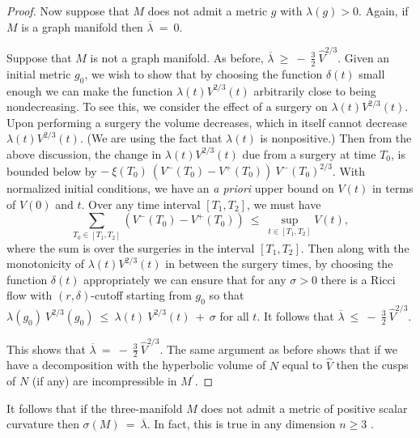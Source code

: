 \begin{proof}
Now suppose that $M$ does not admit a metric $g$ with $\lambda(g) > 0$.
Again, if $M$ is a graph manifold then $\overline{\lambda} \: = \: 0$.

Suppose that $M$ is not a graph manifold.
As before, $\overline{\lambda} \: \ge \: - \: \frac32 \: \widehat{V}^{2/3}$.
Given an initial metric $g_0$,
we wish to show that by choosing the function $\delta(t)$
small enough we can make the function $\lambda(t) V^{2/3}(t)$
arbitrarily close to being nondecreasing. To see this, we consider
the effect of a surgery on $\lambda(t) V^{2/3}(t)$. Upon performing a surgery
the volume decreases, which in itself cannot decrease
$\lambda(t) V^{2/3}(t)$. (We are using the fact that $\lambda(t)$ is
nonpositive.)
Then from the above discussion, the
change in $\lambda(t) V^{2/3}(t)$ due from a surgery at time $T_0$,
is bounded below by $- \: \xi(T_0) \: (V^-(T_0) - V^+(T_0)) \:
V^-(T_0)^{2/3}$.
With normalized initial conditions,
we have an {\it a priori} upper bound on $V(t)$ in terms of $V(0)$ and $t$.
Over any time interval $[T_1, T_2]$, we must have
\begin{equation}
\sum_{T_0 \in [T_1, T_2]} \left( V^-(T_0) - V^+(T_0) \right) \: \le \:
\sup_{t \in [T_1,T_2]} V(t),
\end{equation}
where the sum is over the surgeries in the
interval $[T_1,T_2]$.
Then along with the monotonicity of $\lambda(t) V^{2/3}(t)$ in between the
 surgery times,  by choosing the function
$\delta(t)$ appropriately we can ensure that
for any
$\sigma > 0$
there is a Ricci flow with $(r, \delta)$-cutoff
starting from $g_0$ so that
$\lambda(g_0) \: V^{2/3}(g_0) \: \le \: \lambda(t) \: V^{2/3}(t) \: + \:
\sigma$ for all $t$.
It follows that
$\overline{\lambda} \: \le \: - \: \frac32 \: \widehat{V}^{2/3}$.

This shows that $\overline{\lambda} \: = \: - \: \frac32 \: \widehat{V}^{2/3}$.
The same argument as before shows that if we have a decomposition
with the hyperbolic volume of $N$ equal to  $\widehat{V}$ then the cusps of $N$
(if any) are incompressible in $M^\prime$.
\end{proof}

\begin{remark}
  \label{rem:kl-alternative-proof-cusp-incompressibility-positivity-scalar-curvature}

It follows that if the three-manifold $M$ does not admit a metric of positive scalar curvature then
$\sigma(M) \: = \: \overline{\lambda}$. In fact, this is true in any dimension
$n \ge 3$ \cite{Akutagawa-Ishida-Lebrun}.
\end{remark}
